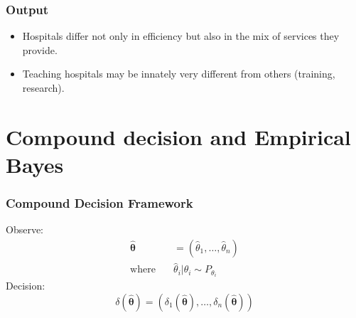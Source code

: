 \documentclass[10pt,mathserif,aspectratio=169]{beamer}
\begin{document}
\begin{frame}[label=output]
  \frametitle{Output}

  \begin{table}
    \begin{adjustbox}{width=0.9\textwidth,center}
      \centering
      
    \end{adjustbox}
  \end{table}
  \begin{itemize}\itemsep = 8pt
    \item Hospitals differ not only in efficiency but also in the mix of services they
          provide.
    \item Teaching hospitals may be innately very different from others (training,
          research).
  \end{itemize}
  \hyperlink{reg_sep}{}
\end{frame}

\section{Compound decision and Empirical Bayes}

\begin{frame}
  \frametitle{Compound Decision Framework}
  Observe:
  \begin{align*}
    \boldsymbol{\hat{\theta}} & =  (\hat{\theta}_1,\ldots, \hat{\theta}_n)  \\
    \text{where} \quad        & \hat{\theta}_i | \theta_i \sim P_{\theta_i}
  \end{align*}
  Decision:
  \begin{equation*}
    \delta(\boldsymbol{\hat{\theta}}) = (\delta_1(\boldsymbol{\hat{\theta}}), \ldots, \delta_n(\boldsymbol{\hat{\theta}}))
  \end{equation*}
\end{frame}
\end{document}
